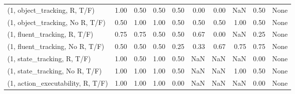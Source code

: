 \begin{table*}[h!]
\begin{adjustbox}{width=2\columnwidth,center}
\begin{tabular}{lrrr|rrr|rrr}
\midrule
(1, object\_tracking, R, T/F)         &                      1.00 &                  0.50 &                      0.50 &                          0.50 &                      0.00 &                          0.00 &                                    NaN &                               0.50 &                                  None \\
(1, object\_tracking, No R, T/F)      &                      0.50 &                  1.00 &                      1.00 &                          0.50 &                      0.50 &                          0.50 &                                   1.00 &                               0.50 &                                  None \\
(1, fluent\_tracking, R, T/F)         &                      0.75 &                  0.75 &                      0.50 &                          0.50 &                      0.67 &                          0.00 &                                    NaN &                               0.25 &                                  None \\
(1, fluent\_tracking, No R, T/F)      &                      0.50 &                  0.50 &                      0.50 &                          0.25 &                      0.33 &                          0.67 &                                   0.75 &                               0.75 &                                  None \\
(1, state\_tracking, R, T/F)          &                      1.00 &                  0.50 &                      1.00 &                          0.50 &                       NaN &                           NaN &                                    NaN &                               0.00 &                                  None \\
(1, state\_tracking, No R, T/F)       &                      1.00 &                  1.00 &                      1.00 &                          0.50 &                       NaN &                           NaN &                                   1.00 &                               0.50 &                                  None \\
(1, action\_executability, R, T/F)    &                      1.00 &                  1.00 &                      1.00 &                          0.00 &                       NaN &                           NaN &                                    NaN &                               0.00 &                                  None \\

\end{tabular}
\end{adjustbox}
\end{table*}
